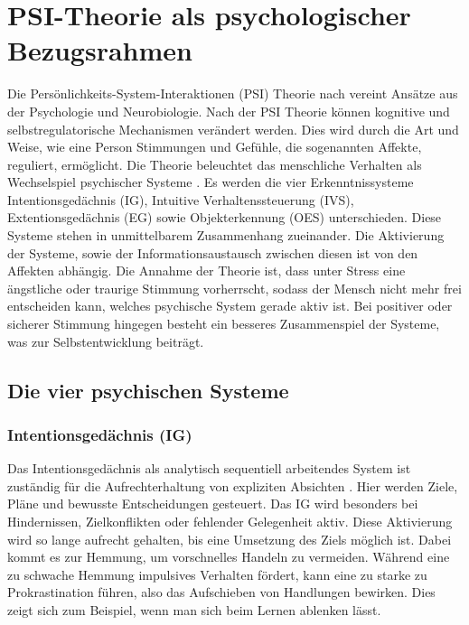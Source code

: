 \section{PSI-Theorie als psychologischer Bezugsrahmen}

Die Persönlichkeits-System-Interaktionen (PSI) Theorie nach \cite{Kuhl2000The} vereint Ansätze aus der Psychologie und Neurobiologie. Nach der PSI Theorie können kognitive und selbstregulatorische Mechanismen verändert werden. Dies wird durch die Art und Weise, wie eine Person Stimmungen und Gefühle, die sogenannten Affekte, reguliert, ermöglicht.
Die Theorie beleuchtet das menschliche Verhalten als Wechselspiel psychischer Systeme \citep{kuhl2005neue}. Es werden die vier Erkenntnissysteme Intentionsgedächnis (IG), Intuitive Verhaltenssteuerung (IVS), Extentionsgedächnis (EG) sowie Objekterkennung (OES) unterschieden. Diese Systeme stehen in unmittelbarem Zusammenhang zueinander. Die Aktivierung der Systeme, sowie der Informationsaustausch zwischen diesen ist von den Affekten abhängig. Die Annahme der Theorie ist, dass unter Stress eine ängstliche oder traurige Stimmung vorherrscht, sodass der Mensch nicht mehr frei entscheiden kann, welches psychische System gerade aktiv ist. Bei positiver oder sicherer Stimmung hingegen besteht ein besseres Zusammenspiel der Systeme, was zur Selbstentwicklung beiträgt.


\subsection{Die vier psychischen Systeme}

\subsubsection{Intentionsgedächnis (IG)}
Das Intentionsgedächnis als analytisch sequentiell arbeitendes System ist zuständig für die Aufrechterhaltung von expliziten Absichten \citep{kuhl2005neue,kuhl2014psi}. Hier werden Ziele, Pläne und bewusste Entscheidungen gesteuert. Das IG wird besonders bei Hindernissen, Zielkonflikten oder fehlender Gelegenheit aktiv. Diese Aktivierung wird so lange aufrecht gehalten, bis eine Umsetzung des Ziels möglich ist. Dabei kommt es zur Hemmung, um vorschnelles Handeln zu vermeiden. Während eine zu schwache Hemmung impulsives Verhalten fördert, kann eine zu starke zu Prokrastination führen, also das Aufschieben von Handlungen bewirken. Dies zeigt sich zum Beispiel, wenn man sich beim Lernen ablenken lässt.

